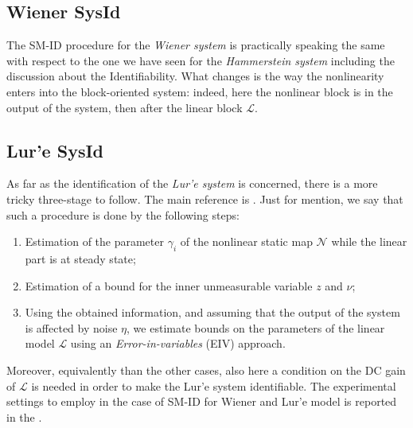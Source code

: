 \subsection{Wiener SysId}
The SM-ID procedure for the \textit{Wiener system} is practically speaking the same with respect to the one we have seen for the \textit{Hammerstein system} including the discussion about the Identifiability. What changes is the way the nonlinearity enters into the block-oriented system: indeed, here the nonlinear block is in the output of the system, then after the linear block $\mathcal{L}$.

\subsection{Lur'e SysId}
As far as the identification of the \textit{Lur'e system} is concerned, there is a more tricky three-stage to follow. The main reference is  \cite{cerone2013bounding}. Just for mention, we say that such a procedure is done by the following steps:
\begin{enumerate}
    \itemsep-0.2em
    \item Estimation of the parameter $\gamma_i$ of the nonlinear static map $\mathcal{N}$ while the linear part is at steady state;
    \item Estimation of a bound for the inner unmeasurable variable $z$ and $\nu$; 
    \item Using the obtained information, and assuming that the output of the system is affected by noise $\eta$, we estimate bounds on the parameters of the linear model $\mathcal{L}$ using an \textit{Error-in-variables} (EIV) approach.
\end{enumerate}
Moreover, equivalently than the other cases, also here a condition on the DC gain of $\mathcal{L}$ is needed in order to make the Lur'e system identifiable. The experimental settings to employ in the case of SM-ID for Wiener and Lur'e model is reported in the .

